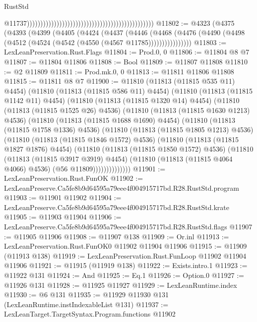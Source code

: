 \begin{lexlean}{RustStd}
\begin{coremodule}
                                                                                                  @11737)))))))))))))))))))))))))))))))))))))))))))))))
@11802 := @4323
    (@4375
      (@4393
        (@4399
          (@4405
            (@4424
              (@4437
                (@4446
                  (@4468
                    (@4476 (@4490 (@4498 (@4512 (@4524 (@4542 (@4550 (@4567 @11785))))))))))))))))
@11803 := LexLeanPreservation.Rust.Flags
@11804 := Prod.{0, 0}
@11806 := @11804 @8 @7
@11807 := @11804 @11806
@11808 := Bool
@11809 := @11807 @11808
@11810 := @2 @11809
@11811 := Prod.mk.{0, 0}
@11813 := @11811 @11806 @11808
@11815 := @11811 @8 @7
@11900 := @11810
    (@11813 (@11815 @535 @11) @4454)
    (@11810
      (@11813 (@11815 @586 @11) @4454)
      (@11810
        (@11813 (@11815 @1142 @11) @4454)
        (@11810
          (@11813 (@11815 @1320 @14) @4454)
          (@11810
            (@11813 (@11815 @1525 @26) @4536)
            (@11810
              (@11813 (@11815 @1630 @1213) @4536)
              (@11810
                (@11813 (@11815 @1688 @1690) @4454)
                (@11810
                  (@11813 (@11815 @1758 @1336) @4536)
                  (@11810
                    (@11813 (@11815 @1805 @1213) @4536)
                    (@11810
                      (@11813 (@11815 @1846 @1572) @4536)
                      (@11810
                        (@11813 (@11815 @1827 @1876) @4454)
                        (@11810
                          (@11813 (@11815 @1850 @1572) @4536)
                          (@11810
                            (@11813 (@11815 @3917 @3919) @4454)
                            (@11810 (@11813 (@11815 @4064 @4066) @4536) (@56 @11809))))))))))))))
@11901 := LexLeanPreservation.Rust.FunOK
@11902 := LexLeanPreserve.Ca5fe8b9d64595a79eee4f004915717bd.R28.RustStd.program
@11903 := @11901 @11902
@11904 := LexLeanPreserve.Ca5fe8b9d64595a79eee4f004915717bd.R28.RustStd.krate
@11905 := @11903 @11904
@11906 := LexLeanPreserve.Ca5fe8b9d64595a79eee4f004915717bd.R28.RustStd.flags
@11907 := @11905 @11906
@11908 := @11907 @138
@11909 := Or.inl
@11913 := LexLeanPreservation.Rust.FunOK0 @11902 @11904 @11906
@11915 := @11909 (@11913 @138)
@11919 := LexLeanPreservation.Rust.FunLoop @11902 @11904 @11906
@11921 := @11915 (@11919 @138)
@11922 := Exists.intro.{1}
@11923 := @11922 @131
@11924 := And
@11925 := Eq.{1}
@11926 := Option.{0}
@11927 := @11926 @131
@11928 := @11925 @11927
@11929 := LexLeanRuntime.index
@11930 := @6 @131
@11935 := @11929 @11930 @131 (LexLeanRuntime.instIndexableList @131)
@11937 := LexLeanTarget.TargetSyntax.Program.functions @11902

\end{coremodule}
\end{lexlean}

